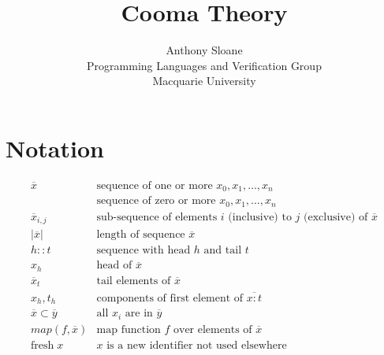 \documentclass[11pt]{article}
\begin{document}
\title{Cooma Theory}

\author{
Anthony Sloane \\
Programming Languages and Verification Group \\
Macquarie University
}

\maketitle

\section{Notation}

\newcommand{\fresh}[1]{\mathrm{fresh}\;#1}
\newcommand{\cons}[2]{\mathit{#1 :: #2}}
\newcommand{\len}[1]{\lvert #1 \rvert}
\newcommand{\map}[2]{\mathit{map}(#1, #2)}
\newcommand{\repo}[1]{\overline{#1}}
\newcommand{\repz}[1]{[\ \repo{#1}\ ]}
\newcommand{\sub}[3]{#1_{#2,#3}}
\newcommand{\subs}[2]{#1 \subset #2}

\newcommand{\arge}[2]{#1 : #2}
\newcommand{\flde}[2]{#1 = #2}
\newcommand{\flds}[2]{\repo{\flde{#1}{#2}}}

\[
\begin{array}{ll}
\repo{x}                 & \text{sequence of one or more $x_0, x_1, \ldots, x_n$} \\
\repz{x}                 & \text{sequence of zero or more $x_0, x_1, \ldots, x_n$} \\
\sub{\repo{x}}{i}{j}     & \text{sub-sequence of elements $i$ (inclusive) to $j$ (exclusive) of $\repo{x}$} \\
\len{\repo{x}}           & \text{length of sequence $\repo{x}$} \\
\cons{h}{t}              & \text{sequence with head $h$ and tail $t$} \\
x_h                      & \text{head of $\repo{x}$} \\
\repo{x}_t               & \text{tail elements of $\repo{x}$} \\
x_h, t_h                 & \text{components of first element of $\repo{\arge{x}{t}}$} \\
\subs{\repo{x}}{\repo{y}} & \text{all $x_i$ are in $\repo{y}$} \\
\map{f}{\repo{x}}         & \text{map function $f$ over elements of $\repo{x}$} \\
\fresh{x}                 & \text{$x$ is a new identifier not used elsewhere} \\
\end{array}
\]
\end{document}
